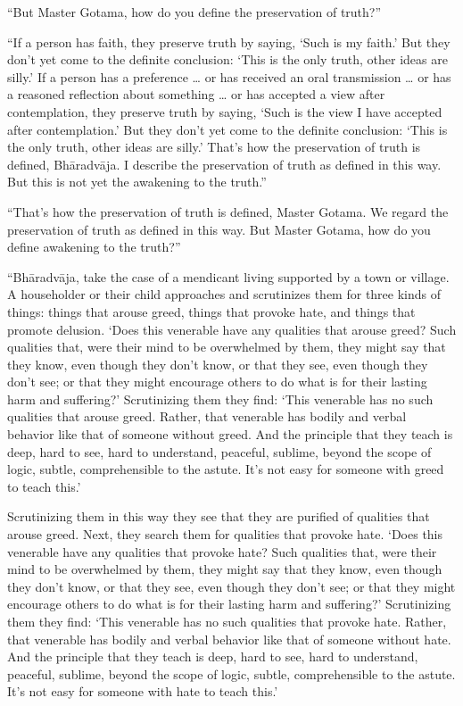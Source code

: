 \documentclass[12pt,openany]{book}%
\begin{document}
“But Master Gotama, how do you define the preservation of truth?” 

“If a person has faith, they preserve truth by saying, ‘Such is my faith.’ But they don’t yet come to the definite conclusion: ‘This is the only truth, other ideas are silly.’ If a person has a preference … or has received an oral transmission … or has a reasoned reflection about something … or has accepted a view after contemplation, they preserve truth by saying, ‘Such is the view I have accepted after contemplation.’ But they don’t yet come to the definite conclusion: ‘This is the only truth, other ideas are silly.’ That’s how the preservation of truth is defined, \textsanskrit{Bhāradvāja}. I describe the preservation of truth as defined in this way. But this is not yet the awakening to the truth.” 

“That’s how the preservation of truth is defined, Master Gotama. We regard the preservation of truth as defined in this way. But Master Gotama, how do you define awakening to the truth?” 

“\textsanskrit{Bhāradvāja}, take the case of a mendicant living supported by a town or village. A householder or their child approaches and scrutinizes them for three kinds of things: things that arouse greed, things that provoke hate, and things that promote delusion. ‘Does this venerable have any qualities that arouse greed? Such qualities that, were their mind to be overwhelmed by them, they might say that they know, even though they don’t know, or that they see, even though they don’t see; or that they might encourage others to do what is for their lasting harm and suffering?’ Scrutinizing them they find: ‘This venerable has no such qualities that arouse greed. Rather, that venerable has bodily and verbal behavior like that of someone without greed. And the principle that they teach is deep, hard to see, hard to understand, peaceful, sublime, beyond the scope of logic, subtle, comprehensible to the astute. It’s not easy for someone with greed to teach this.’ 

Scrutinizing them in this way they see that they are purified of qualities that arouse greed. Next, they search them for qualities that provoke hate. ‘Does this venerable have any qualities that provoke hate? Such qualities that, were their mind to be overwhelmed by them, they might say that they know, even though they don’t know, or that they see, even though they don’t see; or that they might encourage others to do what is for their lasting harm and suffering?’ Scrutinizing them they find: ‘This venerable has no such qualities that provoke hate. Rather, that venerable has bodily and verbal behavior like that of someone without hate. And the principle that they teach is deep, hard to see, hard to understand, peaceful, sublime, beyond the scope of logic, subtle, comprehensible to the astute. It’s not easy for someone with hate to teach this.’ 
\end{document}
